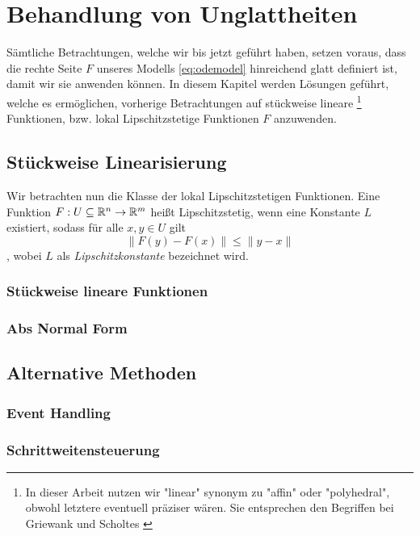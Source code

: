 \chapter{Behandlung von Unglattheiten}
Sämtliche Betrachtungen, welche wir bis jetzt geführt haben, setzen voraus, dass die rechte Seite $F$ unseres Modells \ref{eq:odemodel} hinreichend glatt definiert ist, damit wir sie anwenden können. In diesem Kapitel werden Lösungen geführt, welche es ermöglichen, vorherige Betrachtungen auf stückweise lineare
\footnote{In dieser Arbeit nutzen wir "linear" synonym zu "affin" oder "polyhedral", obwohl letztere eventuell präziser wären. Sie entsprechen den Begriffen bei Griewank \cite{monster} und Scholtes \cite{scholtes2012introduction}}
Funktionen, bzw. lokal Lipschitzstetige Funktionen $F$ anzuwenden. 

\section{Stückweise Linearisierung}
Wir betrachten nun die Klasse der lokal Lipschitzstetigen Funktionen. Eine Funktion $F:U\subseteq \mathbb{R}^n\to \mathbb{R}^m$ heißt Lipschitzstetig, wenn eine Konstante $L$ existiert, sodass für alle $x,y\in U$ gilt
\[
 \|F(y) - F(x)\| \leq \|y-x\|
\]
, wobei $L$ als \textit{Lipschitzkonstante} bezeichnet wird. 



\subsection{Stückweise lineare Funktionen}

\subsection{Abs Normal Form}


\section{Alternative Methoden}
\subsection{Event Handling}
\subsection{Schrittweitensteuerung}
